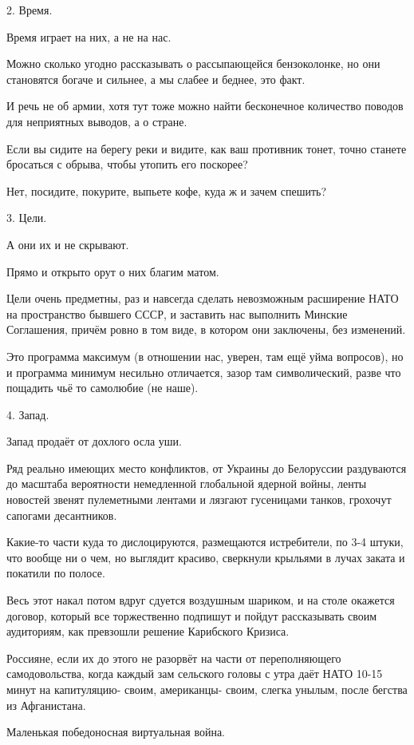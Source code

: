 2.  Время.

Время играет на них, а не на нас.

Можно сколько угодно рассказывать о рассыпающейся бензоколонке, но они
становятся богаче и сильнее, а мы слабее и беднее, это факт.

И речь не об армии, хотя тут тоже можно найти бесконечное количество поводов
для неприятных выводов, а о стране.

Если вы сидите на берегу реки и видите, как ваш противник тонет, точно станете
бросаться с обрыва, чтобы утопить его поскорее?

Нет, посидите, покурите, выпьете кофе, куда ж и зачем спешить?

3.  Цели.

А они их и не скрывают.

Прямо и открыто орут о них благим матом.

Цели очень предметны, раз и навсегда сделать невозможным расширение НАТО на
пространство бывшего СССР, и заставить нас выполнить Минские Соглашения, причём
ровно в том виде, в котором они заключены, без изменений.

Это программа максимум (в отношении нас, уверен, там ещё уйма вопросов), но и
программа минимум несильно отличается, зазор там символический, разве что
пощадить чьё то самолюбие (не наше).

4.  Запад.

Запад продаёт от дохлого осла уши.

Ряд реально имеющих место конфликтов, от Украины до Белоруссии раздуваются до
масштаба вероятности немедленной глобальной ядерной войны, ленты новостей
звенят пулеметными лентами и лязгают гусеницами танков, грохочут сапогами
десантников.

Какие-то части куда то дислоцируются, размещаются истребители, по 3-4 штуки,
что вообще ни о чем, но выглядит красиво, сверкнули крыльями в лучах заката и
покатили по полосе.

Весь этот накал потом вдруг сдуется воздушным шариком, и на столе окажется
договор, который все торжественно подпишут и пойдут рассказывать своим
аудиториям, как превзошли решение Карибского Кризиса.

Россияне, если их до этого не разорвёт на части от переполняющего
самодовольства, когда каждый зам сельского головы с утра даёт НАТО 10-15 минут
на капитуляцию- своим, американцы- своим, слегка унылым, после бегства из
Афганистана.

Маленькая победоносная виртуальная война.

